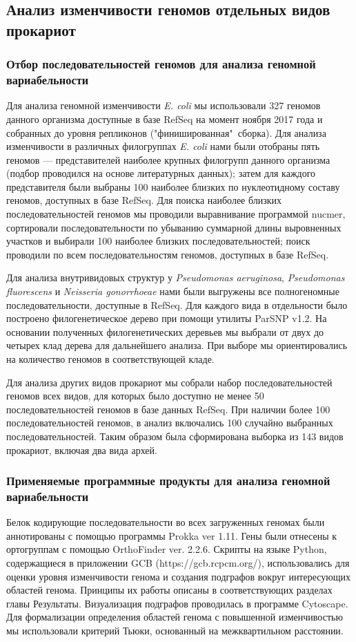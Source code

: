 \subsection*{Анализ изменчивости геномов отдельных видов прокариот}
\subsubsection*{Отбор последовательностей геномов для анализа геномной вариабельности}
Для анализа геномной изменчивости \textit{E. coli} мы использовали 327 геномов данного организма доступные в базе RefSeq на момент ноября 2017 года и собранных до уровня репликонов ("финишированная"\ сборка). Для анализа изменчивости в различных филогруппах \textit{E. coli} нами были отобраны пять геномов --- представителей наиболее крупных филогрупп данного организма (подбор проводился на основе литературных данных); затем для каждого представителя были выбраны 100 наиболее близких по нуклеотидному составу геномов, доступных в базе RefSeq. Для поиска наиболее близких последовательностей геномов мы проводили выравнивание программой nucmer, сортировали последовательности по убыванию суммарной длины выровненных участков и выбирали 100 наиболее близких последовательностей; поиск проводили по всем последовательностям геномов, доступных в базе RefSeq. 

Для анализа внутривидовых структур у \textit{Pseudomonas aeruginosa}, \textit{Pseudomonas fluorescens} и \textit{Neisseria gonorrhoeae} нами были выгружены все полногеномные последовательности, доступные в RefSeq. Для каждого вида в отдельности было построено филогенетическое дерево при помощи утилиты ParSNP v1.2. На основании полученных филогенетических деревьев мы выбрали от двух до четырех клад дерева для дальнейшего анализа. При выборе мы ориентировались на количество геномов в соответствующей кладе. 

Для анализа других видов прокариот мы собрали набор последовательностей геномов всех видов, для которых было доступно не менее 50 последовательностей геномов в базе данных RefSeq. При наличии более 100 последовательностей геномов, в анализ включались 100 случайно выбранных последовательностей. Таким образом была сформирована выборка из 143 видов прокариот, включая два вида архей.

\subsubsection*{Применяемые программные продукты для анализа геномной вариабельности}
Белок кодирующие последовательности во всех загруженных геномах были аннотированы с помощью программы Prokka ver 1.11. Гены были отнесены к ортогруппам с помощью OrthoFinder ver. 2.2.6. Скрипты на языке Python, содержащиеся в приложении GCB (https://gcb.rcpcm.org/), использовались для оценки уровня изменчивости генома и создания подграфов вокруг интересующих областей генома. Принципы их работы описаны в соответствующих разделах главы Результаты. Визуализация подграфов проводилась в программе Cytoscape. Для формализации определения областей генома с повышенной изменчивостью мы использовали критерий Тьюки, основанный на межквартильном расстоянии.

